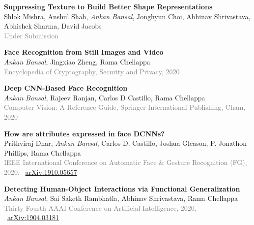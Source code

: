 \documentclass[11pt, a4paper]{article}
\begin{document}
\vspace{4pt}

\textbf{Suppressing Texture to Build Better Shape Representations}\\
Shlok Mishra, Anshul Shah, \textit{Ankan Bansal}, Jonghyun Choi, Abhinav Shrivastava, Abhishek
Sharma, David Jacobs\\
\textcolor{gray}{Under Submission}

\vspace{4pt}

\textbf{Face Recognition from Still Images and Video}\\
\textit{Ankan Bansal}, Jingxiao Zheng, Rama Chellappa\\
\textcolor{gray}{Encyclopedia of Cryptography, Security and Privacy, 2020}

\vspace{4pt}

\textbf{Deep CNN-Based Face Recognition}\\
\textit{Ankan Bansal}, Rajeev Ranjan, Carlos D Castillo, Rama Chellappa\\
\textcolor{gray}{Computer Vision: A Reference Guide, Springer International Publishing, Cham, 2020}

%
\vspace{4pt}

\textbf{How are attributes expressed in face DCNNs?}\\
Prithviraj Dhar, \textit{Ankan Bansal}, Carlos D. Castillo, Joshua Gleason, P. Jonathon Phillips, Rama Chellappa\\
\textcolor{gray}{IEEE International Conference on Automatic Face \& Gesture Recognition (FG), 2020,} ~\href{https://arxiv.org/abs/1910.05657}{arXiv:1910.05657}

\vspace{4pt}

\textbf{Detecting Human-Object Interactions via Functional Generalization}\\
\textit{Ankan Bansal}, Sai Saketh Rambhatla, Abhinav Shrivastava, Rama Chellappa\\
\textcolor{gray}{Thirty-Fourth AAAI Conference on Artificial Intelligence, 2020,} ~\href{https://arxiv.org/abs/1904.03181}{arXiv:1904.03181}
\end{document}
